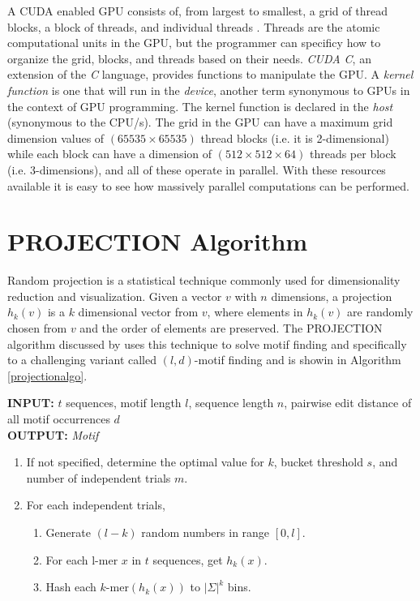 \documentclass{llncs}
\begin{document}
{A CUDA enabled GPU consists of, from largest to smallest, a grid of thread blocks, a block of threads, and individual threads \cite{cudaguide}. Threads are the atomic computational units in the GPU, but the programmer can specificy how to organize the grid, blocks, and threads based on their needs. \textit{CUDA C}, an extension of the \textit{C} language, provides functions to manipulate the GPU. A \textit{kernel function} is one that will run in the \textit{device}, another term synonymous to GPUs in the context of GPU programming. The kernel function is declared in the \textit{host} (synonymous to the CPU/s). The grid in the GPU can have a maximum grid dimension values of $(65535 \times 65535)$ thread blocks (i.e. it is 2-dimensional) while each block can have a dimension of $(512 \times 512 \times 64)$ threads per block (i.e. 3-dimensions), and all of these operate in parallel. With these resources available it is easy to see how massively parallel computations can be performed. 

\section{PROJECTION Algorithm}\label{projection}

Random projection  is a statistical technique commonly used for dimensionality reduction and visualization. Given a vector $v$ with $n$ dimensions, a projection $h_k(v)$ is a $k$ dimensional vector from $v$,  where elements in $h_k(v)$ are randomly chosen from $v$ and the order of elements are preserved. The PROJECTION algorithm discussed by \cite{tompa} uses this technique to solve motif finding and specifically to a challenging variant called $(l,d)$-motif finding and is showin in Algorithm \ref{projectionalgo}.

\begin{algorithm}\label{projectionalgo}
\noindent \noindent\textbf{INPUT:} $t$ sequences, motif length $l$, sequence length $n$, pairwise edit distance of all motif occurrences $d$\\
\textbf{OUTPUT:} \textit{Motif}
\begin{enumerate}
\item If not specified, determine the optimal value for $k$,  bucket threshold $s$, and  number of independent trials $m$.
\item For each independent trials, 
\begin{enumerate}
	\item Generate $(l-k)$ random numbers in range $[0,l]$.
	\item For each l-mer $x$ in $t$ sequences, get $h_k(x).$	
	\item Hash each $k$-mer$(h_k(x))$ to $|\Sigma|^k$ bins.
\end{enumerate}


\end{enumerate}
\end{algorithm}}
\end{document}

